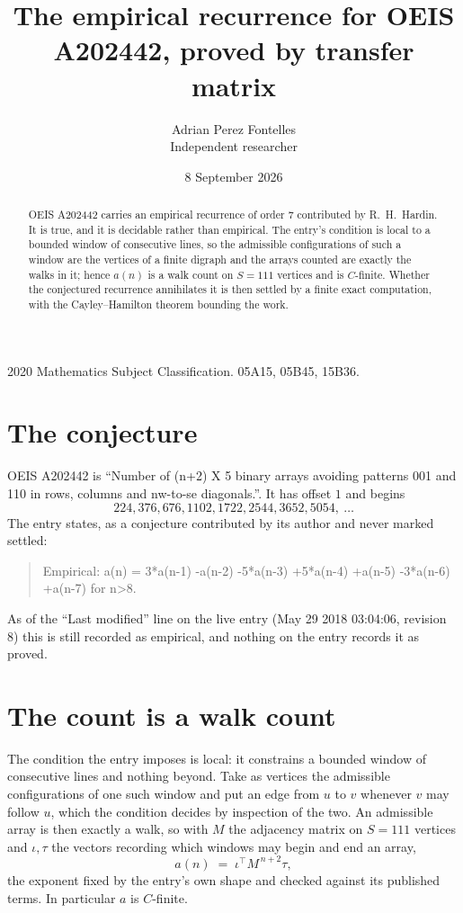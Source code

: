 \documentclass[11pt,a4paper]{article}
\title{The empirical recurrence for OEIS A202442, proved by transfer matrix}
\author{Adrian Perez Fontelles\\ \small Independent researcher}
\date{8 September 2026}
\theoremstyle{plain}
\theoremstyle{definition}
\begin{document}
\maketitle

\begin{abstract}
OEIS A202442 carries an empirical recurrence of order $7$ contributed by R.~H.~Hardin. It is
true, and it is decidable rather than empirical. The entry's condition is local to a bounded window of consecutive lines, so
the admissible configurations of such a window are the vertices of a finite digraph and the
arrays counted are exactly the walks in it; hence $a(n)$ is a walk count on $S=111$ vertices
and is $C$-finite. Whether the conjectured recurrence annihilates it is then settled by a
finite exact computation, with the Cayley--Hamilton theorem bounding the work.
\end{abstract}

\noindent\small 2020 Mathematics Subject Classification. 05A15, 05B45, 15B36.\normalsize

\section{The conjecture}

OEIS A202442 is ``Number of (n+2) X 5 binary arrays avoiding patterns 001 and 110 in rows, columns and nw-to-se diagonals.''. It has offset $1$ and begins
\[
224, 376, 676, 1102, 1722, 2544, 3652, 5054,\ \dots
\]
The entry states, as a conjecture contributed by its author and never marked settled:
\begin{quote}
Empirical: a(n) = 3*a(n-1) -a(n-2) -5*a(n-3) +5*a(n-4) +a(n-5) -3*a(n-6) +a(n-7) for n>8.
\end{quote}
As of the ``Last modified'' line on the live entry (May 29 2018 03:04:06, revision 8) this is still
recorded as empirical, and nothing on the entry records it as proved.

\section{The count is a walk count}

The condition the entry imposes is local: it constrains a bounded window of consecutive lines and nothing beyond. Take as
vertices the admissible configurations of one such window and put an edge from $u$ to $v$
whenever $v$ may follow $u$, which the condition decides by inspection of the two. An
admissible array is then exactly a walk, so with $M$ the adjacency matrix on $S=111$ vertices
and $\iota,\tau$ the vectors recording which windows may begin and end an array,
\[
a(n)\;=\;\iota^{\!\top}M^{\,n+2}\tau ,
\]
the exponent fixed by the entry's own shape and checked against its published terms. In
particular $a$ is $C$-finite.
\end{document}
